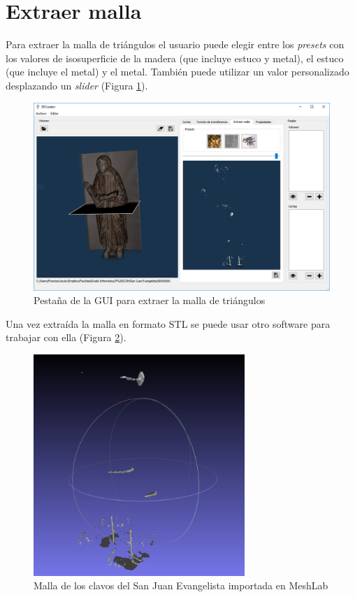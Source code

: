 \section{Extraer malla}

Para extraer la malla de triángulos el usuario puede elegir entre los \textit{presets} con los valores de isosuperficie de la madera (que incluye estuco y metal), el estuco (que incluye el metal) y el metal. También puede utilizar un valor personalizado desplazando un \textit{slider} (Figura \ref{fig:pestana_malla}).

\begin{figure}[H]
	\centering
	\includegraphics[width=12.5cm]{imagenes/pestana_malla}
	\caption{Pestaña de la GUI para extraer la malla de triángulos}
	\label{fig:pestana_malla}
\end{figure}

Una vez extraída la malla en formato STL se puede usar otro software para trabajar con ella (Figura \ref{fig:malla_clavos_meshlab}).

\begin{figure}[H]
	\centering
	\includegraphics[width=8cm]{imagenes/malla_clavos_meshlab}
	\caption{Malla de los clavos del San Juan Evangelista importada en MeshLab \cite{meshlab}}
	\label{fig:malla_clavos_meshlab}
\end{figure}
